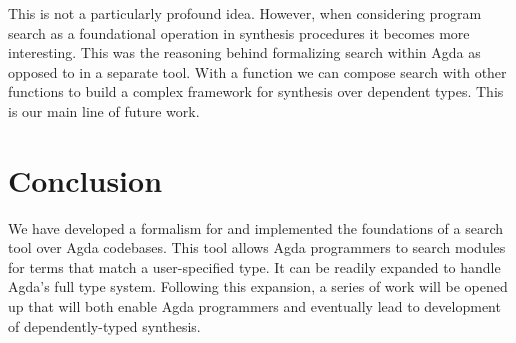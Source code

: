 \documentclass[acmsmall,review,authorversion]{acmart}
\newcommand{\?}{\stackrel{?}{\approx}}
\begin{document}
This is not a particularly profound idea. However, when considering program
search as a foundational operation in synthesis procedures it becomes more
interesting. This was the reasoning behind formalizing search within Agda as
opposed to in a separate tool. With a function we can compose search with other
functions to build a complex framework for synthesis over dependent types. This
is our main line of future work.


\section{Conclusion}

We have developed a formalism for and implemented the foundations of a search
tool over Agda codebases. This tool allows Agda programmers to search modules
for terms that match a user-specified type. It can be readily expanded to handle
Agda's full type system. Following this expansion, a series of work will be
opened up that will both enable Agda programmers and eventually lead to
development of dependently-typed synthesis.

\newpage



\end{document}
